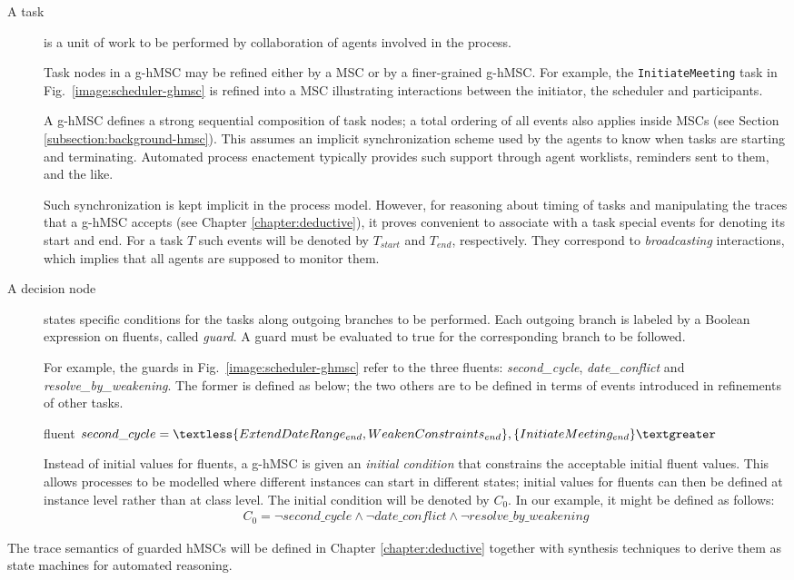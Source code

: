 \begin{description}
\item[A task] is a unit of work to be performed by collaboration of agents involved in the process. 

Task nodes in a g-hMSC may be refined either by a MSC or by a finer-grained g-hMSC. For example, the \texttt{InitiateMeeting} task in Fig.~\ref{image:scheduler-ghmsc} is refined into a MSC illustrating interactions between the initiator, the scheduler and participants. 

A g-hMSC defines a strong sequential composition of task nodes; a total ordering of all events also applies inside MSCs (see Section \ref{subsection:background-hmsc}). This assumes an implicit synchronization scheme used by the agents to know when tasks are starting and terminating. Automated process enactement typically provides such support through agent worklists, reminders sent to them, and the like. 

Such synchronization is kept implicit in the process model. However, for reasoning about timing of tasks and manipulating the traces that a g-hMSC accepts (see Chapter \ref{chapter:deductive}), it proves convenient to associate with a task special events for denoting its start and end. For a task $T$ such events will be denoted by $T_{start}$ and $T_{end}$, respectively. They correspond to \emph{broadcasting} interactions, which implies that all agents are supposed to monitor them.

\item[A decision node] states specific conditions for the tasks along outgoing branches to be performed. Each outgoing branch is labeled by a Boolean expression on fluents, called \emph{guard}. A guard must be evaluated to true for the corresponding branch to be followed.

For example, the guards in Fig.~\ref{image:scheduler-ghmsc} refer to the three fluents: \emph{second\_cycle}, \emph{date\_conflict} and \emph{resolve\_by\_weakening}. The former is defined as below; the two others are to be defined in terms of events introduced in refinements of other tasks.
\begin{center}
fluent $second\_cycle = \textless \{ ExtendDateRange_{end}, \newline WeakenConstraints_{end} \},
 \{ InitiateMeeting_{end} \} \textgreater $\\
\end{center}

Instead of initial values for fluents, a g-hMSC is given an \emph{initial condition} that constrains the acceptable initial fluent values. This allows processes to be modelled where different instances can start in different states; initial values for fluents can then be defined at instance level rather than at class level. The initial condition will be denoted by $C_0$. In our example, it might be defined as follows:
\begin{align*}
C_0 = \neg second\_cycle \wedge \neg date\_conflict \wedge \neg resolve\_by\_weakening
\end{align*}

\end{description} 

The trace semantics of guarded hMSCs will be defined in Chapter \ref{chapter:deductive} together with synthesis techniques to derive them as state machines for automated reasoning.
